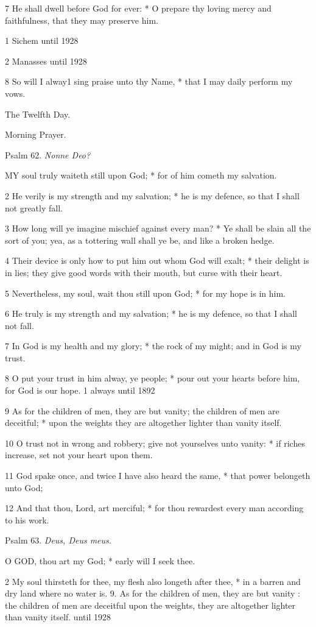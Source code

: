 7 He shall dwell before God for ever: * O prepare thy
loving mercy and faithfulness, that they may preserve him.

1 Sichem
until 1928

2 Manasses
until 1928

8 So will I alway1 sing praise unto thy Name, * that I may
daily perform my vows. 

The
Twelfth Day.

Morning
Prayer.

Psalm
62. \emph{Nonne Deo?}

MY
soul truly waiteth still upon God; * for of him cometh my salvation.

2 He verily is my strength and my salvation; * he is
my defence, so that I shall not greatly fall.

3 How long will ye imagine mischief against every man?
* Ye shall be slain all the sort of you; yea, as a tottering wall shall
ye be, and like a broken hedge.

4 Their device is only how to put him out whom God
will exalt; * their delight is in lies; they give good words with their
mouth, but curse with their heart.

5 Nevertheless, my soul, wait thou still upon God;
* for my hope is in him.

6 He truly is my strength and my salvation; * he is
my defence, so that I shall not fall.

7 In God is my health and my glory; * the rock of my
might; and in God is my trust.

8 O put your trust in him alway, ye people; * pour
out your hearts before him, for God is our hope.
1 always
until 1892

9 As for the children of men, they are but vanity; the children of men
are deceitful; * upon the weights they are altogether lighter than vanity
itself.

10 O trust not in wrong and robbery; give not yourselves
unto vanity: * if riches increase, set not your heart upon them.

11 God spake once, and twice I have also heard the
same, * that power belongeth unto God;

12 And that thou, Lord, art merciful; * for thou rewardest
every man according to his work.

Psalm
63. \emph{Deus, Deus meus.}

O
GOD, thou art my God; * early will I seek thee.

2 My soul thirsteth for thee, my flesh also longeth
after thee, * in a barren and dry land where no water is. 9. As for the children of
men, they are but vanity : the children of men are deceitful upon the weights,
they are altogether lighter than vanity itself.
until 1928

